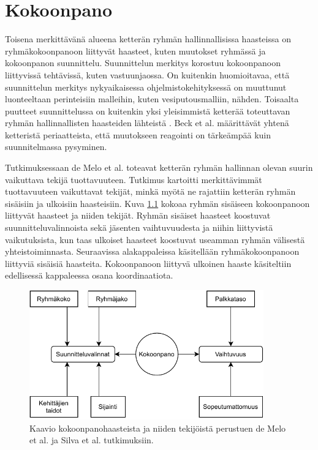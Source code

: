 \chapter{Kokoonpano}

Toisena merkittävänä alueena ketterän ryhmän hallinnallisissa haasteissa on ryhmäkokoonpanoon liittyvät haasteet, kuten muutokset ryhmässä ja kokoonpanon suunnittelu. Suunnittelun merkitys korostuu kokoonpanoon liittyvissä tehtävissä, kuten vastuunjaossa. On kuitenkin huomioitavaa, että suunnittelun merkitys nykyaikaisessa ohjelmistokehityksessä on muuttunut luonteeltaan perinteisiin malleihin, kuten vesiputousmalliin, nähden. Toisaalta puutteet suunnittelussa on kuitenkin yksi yleisimmistä ketterää toteuttavan ryhmän hallinnallisten haasteiden lähteistä \cite{7872736}. Beck et al. \cite{beck2001agile} määrittävät yhtenä ketteristä periaatteista, että muutokseen reagointi on tärkeämpää kuin suunnitelmassa pysyminen.

Tutkimuksessaan de Melo et al. \cite{DEOMELO2013412} toteavat ketterän ryhmän hallinnan olevan suurin vaikuttava tekijä tuottavuuteen. Tutkimus kartoitti merkittävimmät tuottavuuteen vaikuttavat tekijät, minkä myötä ne rajattiin ketterän ryhmän sisäisiin ja ulkoisiin haasteisiin. Kuva \ref{fig:kokoonpanohaasteet} kokoaa ryhmän sisäiseen kokoonpanoon liittyvät haasteet ja niiden tekijät. Ryhmän sisäiset haasteet koostuvat suunnitteluvalinnoista sekä jäsenten vaihtuvuudesta ja niihin liittyvistä vaikutuksista, kun taas ulkoiset haasteet koostuvat useamman ryhmän välisestä yhteistoiminnasta. Seuraavissa alakappaleissa käsitellään ryhmäkokoonpanoon liittyviä sisäisiä haasteita. Kokoonpanoon liittyvä ulkoinen haaste käsiteltiin edellisessä kappaleessa osana koordinaatiota.


\begin{figure}[t]
\centering 
\includegraphics[width=0.9\textwidth]{template/figures/kokoonpanohaasteet.pdf}
\caption{Kaavio kokoonpanohaasteista ja niiden tekijöistä perustuen de Melo et al. \cite{DEOMELO2013412} ja Silva et al. \cite{SELLERISILVA201520} tutkimuksiin.\label{fig:kokoonpanohaasteet}}
\end{figure}


